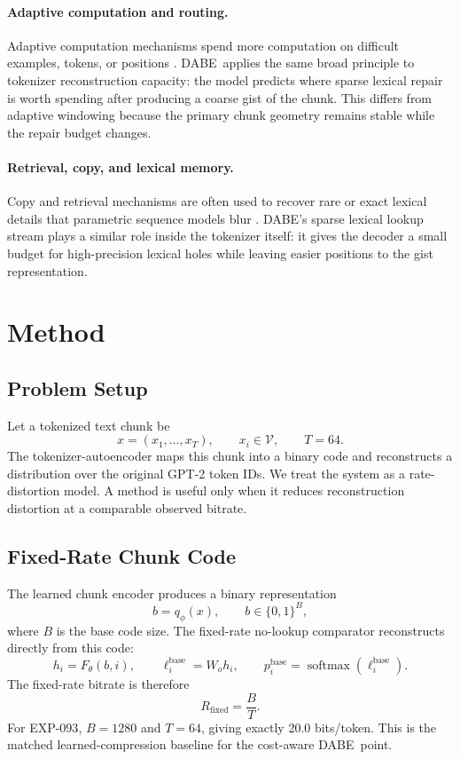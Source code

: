 \documentclass[11pt]{article}
\newcommand{\dabe}{\textsc{DABE}}
\newcommand{\Exp}[1]{\textsc{EXP-#1}}
\newcommand{\bitsper}{bits/token}
\newcommand{\Vocab}{\mathcal{V}}
\newcommand{\softmax}{\operatorname{softmax}}
\begin{document}
\paragraph{Adaptive computation and routing.}
Adaptive computation mechanisms spend more computation on difficult examples, tokens, or positions \cite{graves2016act,bengio2013estimating}. \dabe\ applies the same broad principle to tokenizer reconstruction capacity: the model predicts where sparse lexical repair is worth spending after producing a coarse gist of the chunk. This differs from adaptive windowing because the primary chunk geometry remains stable while the repair budget changes.

\paragraph{Retrieval, copy, and lexical memory.}
Copy and retrieval mechanisms are often used to recover rare or exact lexical details that parametric sequence models blur \cite{gu2016copy,guu2020realm}. \dabe{}'s sparse lexical lookup stream plays a similar role inside the tokenizer itself: it gives the decoder a small budget for high-precision lexical holes while leaving easier positions to the gist representation.

\section{Method}
\subsection{Problem Setup}
Let a tokenized text chunk be
\begin{equation}
  x = (x_1, \ldots, x_T), \qquad x_i \in \Vocab, \qquad T = 64.
\end{equation}
The tokenizer-autoencoder maps this chunk into a binary code and reconstructs a distribution over the original GPT-2 token IDs. We treat the system as a rate-distortion model. A method is useful only when it reduces reconstruction distortion at a comparable observed bitrate.

\subsection{Fixed-Rate Chunk Code}
The learned chunk encoder produces a binary representation
\begin{equation}
  b = q_\phi(x), \qquad b \in \{0,1\}^{B},
\end{equation}
where $B$ is the base code size. The fixed-rate no-lookup comparator reconstructs directly from this code:
\begin{equation}
  h_i = F_\theta(b, i), \qquad
  \ell_i^{\mathrm{base}} = W_o h_i, \qquad
  p_i^{\mathrm{base}} = \softmax(\ell_i^{\mathrm{base}}).
\end{equation}
The fixed-rate bitrate is therefore
\begin{equation}
  R_{\mathrm{fixed}} = \frac{B}{T}.
\end{equation}
For \Exp{093}, $B=1280$ and $T=64$, giving exactly 20.0 \bitsper. This is the matched learned-compression baseline for the cost-aware \dabe\ point.
\end{document}

